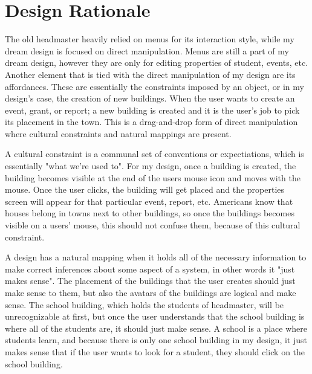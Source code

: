\documentclass[11pt]{article}
\begin{document}
\section{Design Rationale}
The old headmaster heavily relied on menus for its interaction style, while my dream design is focused on direct manipulation. Menus are still a part of my dream design, however they are only for editing properties of student, events, etc. Another element that is tied with the direct manipulation of my design are its affordances. These are essentially the constraints imposed by an object, or in my design's case, the creation of new buildings. When the user wants to create an event, grant, or report; a new building is created and it is the user's job to pick its placement in the town. This is a drag-and-drop form of direct manipulation where cultural constraints and natural mappings are present. 

A cultural constraint is a communal set of conventions or expectiations, which is essentially "what we're used to". For my design, once a building is created, the building becomes visible at the end of the users mouse icon and moves with the mouse. Once the user clicks, the building will get placed and the properties screen will appear for that particular event, report, etc. Americans know that houses belong in towns next to other buildings, so once the buildings becomes visible on a users' mouse, this should not confuse them, because of this cultural constraint. 

A design has a natural mapping when it holds all of the necessary information to make correct inferences about some aspect of a system, in other words it "just makes sense". The placement of the buildings that the user creates should just make sense to them, but also the avatars of the buildings are logical and make sense. The school building, which holds the students of headmaster, will be unrecognizable at first, but once the user understands that the school building is where all of the students are, it should just make sense. A school is a place where students learn, and because there is only one school building in my design, it just makes sense that if the user wants to look for a student, they should click on the school building. 
\end{document}
